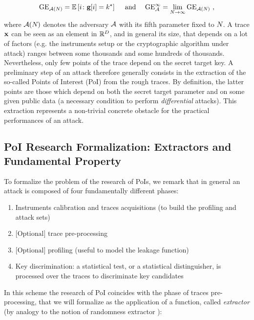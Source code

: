 \begin{equation}
\guessingEntropy_{\adversary(\numTraces[])}  = \mathbb{E}\left[i \colon \guessingVector[i] = \keyTest \right] \quad \mbox{ and } \quad \guessingEntropy^\infty_\adversary  = \lim_{\numTraces[]\rightarrow \infty} \guessingEntropy_{\adversary(\numTraces[])} \mbox{ ,}
\end{equation}
where $\adversary(\numTraces[])$ denotes the adversary $\adversary$ with its fifth parameter fixed to $\numTraces[]$.
A trace $\sss[]{}$ can be seen as an element in $\mathbb{R}^\traceLength$, and in general its size, that depends on a lot of factors (e.g. the instruments setup or the cryptographic algorithm under attack) ranges between some thousands and some hundreds of thousands. Nevertheless, only few points of the trace depend on the secret target key. A preliminary step of an attack therefore generally consists in the extraction of the so-called {Points of Interest (PoI)} from the  rough traces. By definition, the latter points are those which depend on both the secret target parameter and on some given public data (a necessary condition to perform {\em differential} attacks). This extraction represents a non-trivial concrete obstacle for the practical performances of an attack.

\subsection{PoI Research Formalization: Extractors and Fundamental Property}


To formalize the problem of the research of PoIs, we remark that in general an attack is composed of four fundamentally different phases:

\begin{enumerate}
\item Instruments calibration and traces acquisitions (to build the profiling and attack sets)
\item $\mbox{[Optional]}$ trace pre-processing
\item $\mbox{[Optional]}$  profiling (useful to model the leakage function)
\item Key discrimination: a  statistical test, or a statistical distinguisher, is processed over the  traces to discriminate key candidates
\end{enumerate}
In this scheme the research of PoI coincides with the phase of traces pre-processing, that we will formalize as the application of a function, called {\em extractor} (by analogy to the notion of randomness extractor \cite{DBLP:journals/jcss/NisanZ96}):

